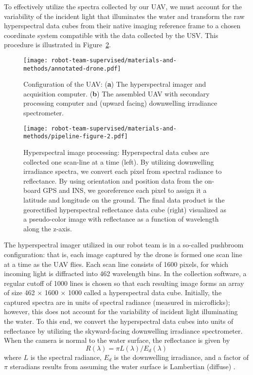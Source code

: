 To effectively utilize the spectra collected by our UAV, we must account for the variability of the incident light that illuminates the water and transform the raw hyperspectral data cubes from their native imaging reference frame to a chosen coordinate system compatible with the data collected by the USV. This procedure is illustrated in Figure~\ref{fig:hsi-pipeline}.

\begin{figure}[H]
  \centering
  \texttt{[image: robot-team-supervised/materials-and-methods/annotated-drone.pdf]}
  \caption{Configuration of the UAV: (\textbf{a}) The hyperspectral imager and
    acquisition computer. (\textbf{b}) The assembled UAV with secondary
    processing computer and (upward facing) downwelling irradiance
    spectrometer. \label{fig:drone-components}}
\end{figure}

\begin{figure}[H]
  \centering
  \texttt{[image: robot-team-supervised/materials-and-methods/pipeline-figure-2.pdf]}
  \caption{Hyperspectral image processing: Hyperspectral data cubes are
    collected one scan-line at a time (left). By utilizing downwelling
    irradiance spectra, we convert each pixel from spectral radiance to
    reflectance. By using orientation and position data from the on-board GPS
    and INS, we georeference each pixel to assign it a latitude and longitude on
    the ground. The final data product is the georectified hyperspectral
    reflectance data cube (right) visualized as a pseudo-color image with
    reflectance  as a function of wavelength along the
    z-axis.\label{fig:hsi-pipeline}}
\end{figure}

The hyperspectral imager utilized in our robot team is in a so-called pushbroom configuration: that is, each image captured by the drone is formed one scan line at a time as the UAV flies. Each scan line consists of 1600 pixels, for which incoming light is diffracted into 462 wavelength bins. In the collection software, a regular cutoff of 1000 lines is chosen so that each resulting image forms an array of size 462 $\times$ 1600 $\times$ 1000 called a hyperspectral data cube. Initially, the captured spectra are in units of spectral radiance (measured in microflicks); however, this does not account for the variability of incident light illuminating the water. To this end, we convert the hyperspectral data cubes into units of reflectance by utilizing the skyward-facing downwelling irradiance spectrometer. When the camera is normal to the water surface, the reflectance is given by
\begin{equation}
    R(\lambda) = \pi L(\lambda)/E_d(\lambda)
\end{equation}
where $L$ is the spectral radiance, $E_d$ is the downwelling irradiance, and a factor of $\pi$ steradians results from assuming the water surface is Lambertian (diffuse) \cite{ruddick2019review}. 

